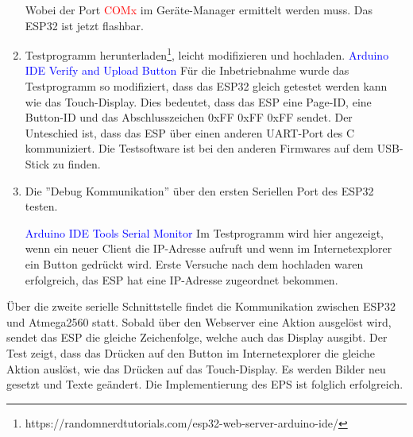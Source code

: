 \begin{enumerate}
Wobei der Port \textcolor{red}{COMx} im Geräte-Manager ermittelt werden muss. Das ESP32 ist jetzt flashbar.\newline

\item Testprogramm herunterladen\footnote{https://randomnerdtutorials.com/esp32-web-server-arduino-ide/}, leicht modifizieren und hochladen.\newline
\textcolor{blue}{Arduino IDE \textrightarrow Verify and Upload Button} \newline
Für die Inbetriebnahme wurde das Testprogramm so modifiziert, dass das ESP32 gleich getestet werden kann wie das Touch-Display. Dies bedeutet, dass das ESP eine Page-ID, eine Button-ID und das Abschlusszeichen 0xFF 0xFF 0xFF sendet. Der Unteschied ist, dass das ESP über einen anderen UART-Port des \textmu C kommuniziert. Die Testsoftware ist bei den anderen Firmwares auf dem USB-Stick zu finden.\newline
\item Die ''Debug Kommunikation'' über den ersten Seriellen Port des ESP32 testen.

\textcolor{blue}{Arduino IDE \textrightarrow Tools \textrightarrow Serial Monitor}\newline
Im Testprogramm wird hier angezeigt, wenn ein neuer Client die IP-Adresse aufruft und wenn im Internetexplorer ein Button gedrückt wird. Erste Versuche nach dem hochladen waren erfolgreich, das ESP hat eine IP-Adresse zugeordnet bekommen.
\end{enumerate}

Über die zweite serielle Schnittstelle findet die Kommunikation zwischen ESP32 und Atmega2560 statt. Sobald über den Webserver eine Aktion ausgelöst wird, sendet das ESP die gleiche Zeichenfolge, welche auch das Display ausgibt. Der Test zeigt, dass das Drücken auf den Button im Internetexplorer die gleiche Aktion auslöst, wie das Drücken auf das Touch-Display. Es werden Bilder neu gesetzt und Texte geändert. Die Implementierung des EPS ist folglich erfolgreich.